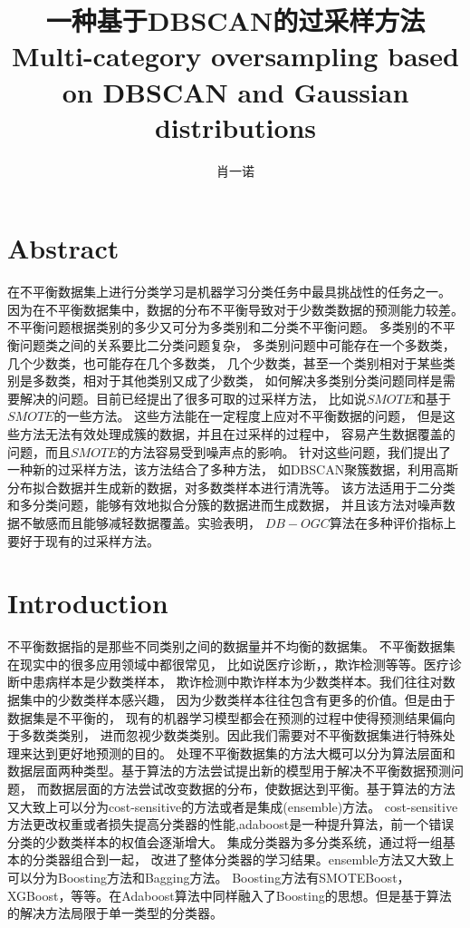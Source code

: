 \documentclass{article}
\begin{document}
\title{一种基于DBSCAN的过采样方法
Multi-category oversampling based on DBSCAN and Gaussian distributions}
\author{肖一诺}
 
\maketitle
\section{Abstract}
在不平衡数据集上进行分类学习是机器学习分类任务中最具挑战性的任务之一。
因为在不平衡数据集中，数据的分布不平衡导致对于少数类数据的预测能力较差。
不平衡问题根据类别的多少又可分为多类别和二分类不平衡问题。
多类别的不平衡问题类之间的关系要比二分类问题复杂，
多类别问题中可能存在一个多数类，几个少数类，也可能存在几个多数类，
几个少数类，甚至一个类别相对于某些类别是多数类，相对于其他类别又成了少数类，
如何解决多类别分类问题同样是需要解决的问题。目前已经提出了很多可取的过采样方法，
比如说$SMOTE$和基于$SMOTE$的一些方法。
这些方法能在一定程度上应对不平衡数据的问题，
但是这些方法无法有效处理成簇的数据，并且在过采样的过程中，
容易产生数据覆盖的问题，而且$SMOTE$的方法容易受到噪声点的影响。
针对这些问题，我们提出了一种新的过采样方法，该方法结合了多种方法，
如DBSCAN聚簇数据，利用高斯分布拟合数据并生成新的数据，对多数类样本进行清洗等。
该方法适用于二分类和多分类问题，能够有效地拟合分簇的数据进而生成数据，
并且该方法对噪声数据不敏感而且能够减轻数据覆盖。实验表明，
$DB-OGC$算法在多种评价指标上要好于现有的过采样方法。

\section{Introduction}
不平衡数据\cite{2004Editorial}指的是那些不同类别之间的数据量并不均衡的数据集。
不平衡数据集在现实中的很多应用领域中都很常见，
比如说医疗诊断\cite{2013Computational}，\cite{2019Electrocardiogram}，欺诈检测\cite{2018Imbalanced}等等。医疗诊断中患病样本是少数类样本，
欺诈检测中欺诈样本为少数类样本。我们往往对数据集中的少数类样本感兴趣，
因为少数类样本往往包含有更多的价值。但是由于数据集是不平衡的，
现有的机器学习模型都会在预测的过程中使得预测结果偏向于多数类类别\cite{Victoria2013An}，
进而忽视少数类类别。\cite{2016A}因此我们需要对不平衡数据集进行特殊处理来达到更好地预测的目的。
处理不平衡数据集的方法大概可以分为算法层面\cite{Myoung2015Geometric}和数据层面\cite{2002SMOTE}两种类型。基于算法的方法尝试提出新的模型用于解决不平衡数据预测问题\cite{Chen_2016,article_boosting}，
而数据层面的方法尝试改变数据的分布\cite{2004A}，使数据达到平衡。基于算法的方法又大致上可以分为cost-sensitive的方法\cite{article,2010Risk}或者是集成(ensemble)方法\cite{2003Bagging}。
cost-sensitive方法更改权重或者损失提高分类器的性能\cite{2007Highcost-sensitive},adaboost\cite{10.1007/3-540-59119-2_166}是一种提升算法，前一个错误分类的少数类样本的权值会逐渐增大。
集成分类器为多分类系统，通过将一组基本的分类器组合到一起，
改进了整体分类器的学习结果。ensemble方法又大致上可以分为Boosting\cite{article_boosting}方法和Bagging\cite{2018Multi}方法。
Boosting方法有SMOTEBoost\cite{2003SMOTEBoost}，XGBoost\cite{Chen_2016}，等等。在Adaboost\cite{10.1007/3-540-59119-2_166}算法中同样融入了Boosting的思想。但是基于算法的解决方法局限于单一类型的分类器。
\end{document}
